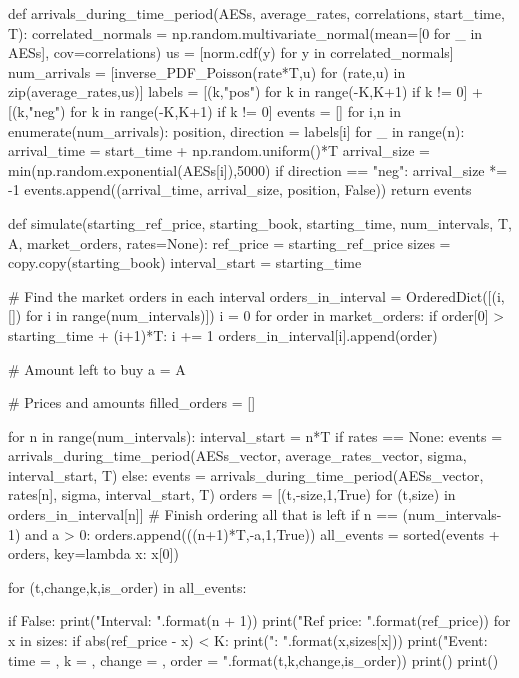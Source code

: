 def arrivals_during_time_period(AESs, average_rates, correlations, start_time, T):
    correlated_normals = np.random.multivariate_normal(mean=[0 for _ in AESs], cov=correlations)
    us = [norm.cdf(y) for y in correlated_normals]
    num_arrivals = [inverse_PDF_Poisson(rate*T,u) for (rate,u) in zip(average_rates,us)]
    labels = [(k,"pos") for k in range(-K,K+1) if k != 0] + [(k,"neg") for k in range(-K,K+1) if k != 0]
    events = []
    for i,n in enumerate(num_arrivals):
        position, direction = labels[i]
        for _ in range(n):
            arrival_time = start_time + np.random.uniform()*T
            arrival_size = min(np.random.exponential(AESs[i]),5000)
            if direction == "neg":
                arrival_size *= -1
            events.append((arrival_time, arrival_size, position, False))
    return events
    
def simulate(starting_ref_price, starting_book, starting_time, num_intervals, T, A, market_orders, rates=None):
    ref_price = starting_ref_price
    sizes = copy.copy(starting_book)
    interval_start = starting_time
    
    # Find the market orders in each interval
    orders_in_interval = OrderedDict([(i,[]) for i in range(num_intervals)])
    i = 0
    for order in market_orders:
        if order[0] > starting_time + (i+1)*T:
            i += 1
        orders_in_interval[i].append(order)
            
    # Amount left to buy
    a = A
    
    # Prices and amounts
    filled_orders = []
    
    
    for n in range(num_intervals):       
        interval_start = n*T
        if rates == None:
            events = arrivals_during_time_period(AESs_vector, average_rates_vector, sigma, interval_start, T)
        else:
            events = arrivals_during_time_period(AESs_vector, rates[n], sigma, interval_start, T)
        orders = [(t,-size,1,True) for (t,size) in orders_in_interval[n]]
        # Finish ordering all that is left
        if n == (num_intervals-1) and a > 0:
            orders.append(((n+1)*T,-a,1,True))
        all_events = sorted(events + orders, key=lambda x: x[0])
        
        for (t,change,k,is_order) in all_events:
            
            if False:
                print("Interval: {}".format(n + 1))
                print("Ref price: {}".format(ref_price))
                for x in sizes:
                    if abs(ref_price - x) < K:
                        print("{}: {}".format(x,sizes[x]))
                print("Event: time = {}, k = {}, change = {}, order = {}".format(t,k,change,is_order))
                print()
                print()
                
